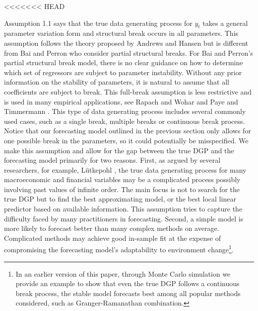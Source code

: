 \begin{assumption}
<<<<<<< HEAD
\end{assumption}
Assumption 1.1 says that the true data generating process for $y_t$ takes a general parameter variation form and structural break occurs in all parameters. This assumption follows the theory proposed by Andrews and Hansen but is different from Bai and Perron who consider partial structural breaks. For Bai and Perron's \cite{bai_perron98} partial structural break model, there is no clear guidance on how to determine which set of regressors are subject to parameter instability. Without any prior information on the stability of parameters, it is natural to assume that all coefficients are subject to break. This full-break assumption is less restrictive and is used in many empirical applications, see Rapach and Wohar \cite{rapach_wohar_JFE2006} and Paye and Timmermann \cite{paye_timmermann_JEF2006}. This type of data generating process includes several commonly used cases, such as a single break, multiple breaks or continuous break process. Notice that our forecasting model outlined in the previous section only allows for one possible break in the parameters, so it could potentially be misspecified. We make this assumption and allow for the gap between the true DGP and the forecasting model primarily for two reasons. First, as argued by several researchers, for example, L\"{u}tkepohl \cite{lutkepohl_textbook}, the true data generating process for many macroeconomic and financial variables may be a complicated process possibly involving past values of infinite order. The main focus is not to search for the true DGP but to find the best approximating model, or the best local linear predictor based on available information. This assumption tries to capture the difficulty faced by many practitioners in forecasting. Second, a simple model is more likely to forecast better than many complex methods on average. Complicated methods may achieve good in-sample fit at the expense of compromising the forecasting model's adaptability to environment change\footnote{In an earlier version of this paper, through Monte Carlo simulation we provide an example to show that even the true DGP follows a continuous break process, the stable model forecasts best among all popular methods considered, such as Granger-Ramanathan combination.}.

